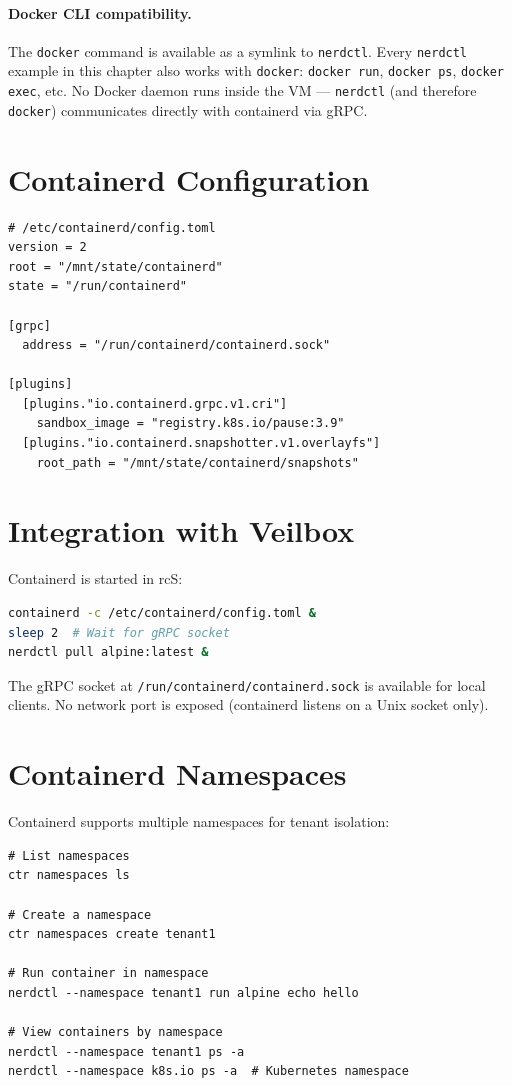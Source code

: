 \paragraph{Docker CLI compatibility.}
The \texttt{docker} command is available as a symlink to \texttt{nerdctl}.
Every \texttt{nerdctl} example in this chapter also works with \texttt{docker}:
\texttt{docker run}, \texttt{docker ps}, \texttt{docker exec}, etc.
No Docker daemon runs inside the VM — \texttt{nerdctl} (and therefore
\texttt{docker}) communicates directly with containerd via gRPC.

\section{Containerd Configuration}

\begin{lstlisting}
# /etc/containerd/config.toml
version = 2
root = "/mnt/state/containerd"
state = "/run/containerd"

[grpc]
  address = "/run/containerd/containerd.sock"

[plugins]
  [plugins."io.containerd.grpc.v1.cri"]
    sandbox_image = "registry.k8s.io/pause:3.9"
  [plugins."io.containerd.snapshotter.v1.overlayfs"]
    root_path = "/mnt/state/containerd/snapshots"
\end{lstlisting}

\section{Integration with Veilbox}

Containerd is started in rcS:

\begin{lstlisting}[language=bash]
containerd -c /etc/containerd/config.toml &
sleep 2  # Wait for gRPC socket
nerdctl pull alpine:latest &
\end{lstlisting}

The gRPC socket at \texttt{/run/containerd/containerd.sock} is available
for local clients. No network port is exposed (containerd listens on a
Unix socket only).

\section{Containerd Namespaces}

Containerd supports multiple namespaces for tenant isolation:

\begin{lstlisting}
# List namespaces
ctr namespaces ls

# Create a namespace
ctr namespaces create tenant1

# Run container in namespace
nerdctl --namespace tenant1 run alpine echo hello

# View containers by namespace
nerdctl --namespace tenant1 ps -a
nerdctl --namespace k8s.io ps -a  # Kubernetes namespace
\end{lstlisting}

